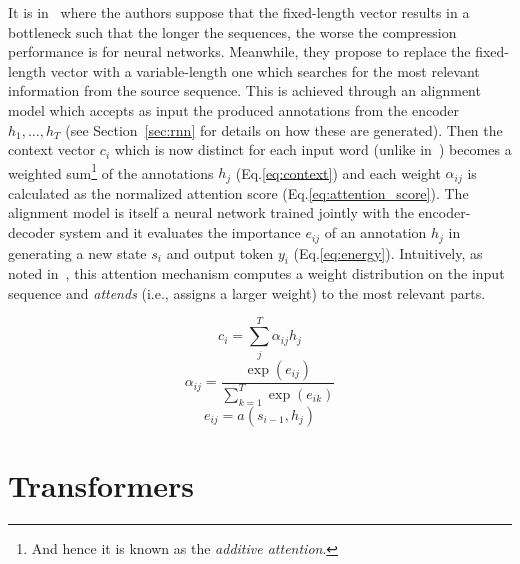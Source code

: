 It is in~\cite{bahdanau2016neural} where the authors suppose that the fixed-length vector results in a bottleneck such that the longer the sequences, the worse the compression performance is for neural networks.
Meanwhile, they propose to replace the fixed-length vector with a variable-length one which searches for the most relevant information from the source sequence.
This is achieved through an alignment model which accepts as input the produced annotations from the encoder $h_1,\ldots, h_T$ (see Section~\ref{sec:rnn} for details on how these are generated).
Then the context vector $c_{i}$ which is now distinct for each input word (unlike in~\cite{cho-etal-2014-learning,sutskever2014sequence}) becomes a weighted sum\footnote{
    And hence it is known as the \emph{additive attention}.
} of the annotations $h_{j}$ (Eq.\ref{eq:context}) and each weight $\alpha_{ij}$ is calculated as the normalized attention score (Eq.\ref{eq:attention_score}).
The alignment model is itself a neural network trained jointly with the encoder-decoder system and it evaluates the importance $e_{ij}$ of an annotation $h_{j}$ in generating a new state $s_{i}$ and output token $y_{i}$ (Eq.\ref{eq:energy}).
Intuitively, as noted in~\cite{galassi2020attention}, this attention mechanism computes a weight distribution on the input sequence and \emph{attends} (i.e., assigns a larger weight) to the most relevant parts.

\begin{equation}\label{eq:context}
    c_i = \sum_j^T{\alpha_{ij}h_j}
\end{equation}
\begin{equation}\label{eq:attention_score}
    \alpha_{ij} = \frac{\exp(e_{ij})}{\sum_{k=1}^{T} \exp(e_{ik})}
\end{equation}
\begin{equation}\label{eq:energy}
    e_{ij} = a(s_{i-1}, h_j)
\end{equation}

\section{Transformers}\label{sec:transformers}

